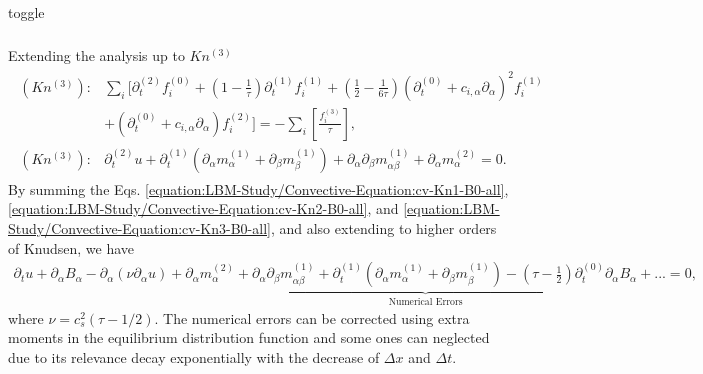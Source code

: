 \documentclass[letterpaper,10pt,english,openany,oneside]{jupyterBook}
\begin{document}
\begin{sphinxuseclass}{toggle}
\begin{equation}
\begin{split}
\begin{array}{l}
\end{array}
\end{split}
\end{equation}
\sphinxAtStartPar
Extending the analysis up to \(Kn^{(3)}\)
\begin{equation}\label{equation:LBM-Study/Convective-Equation:cv-Kn3-B0-all}
\begin{split}
\begin{array}{ll}
(Kn^{(3)}):& \displaystyle\sum_{i}\Bigg[ \partial_{t}^{(2)} f_{i}^{(0)} + \left(1-\displaystyle\frac{1}{\tau}\right)\partial_{t}^{(1)} f_{i}^{(1)} + \left(\frac{1}{2} - \frac{1}{6\tau}\right) \left( \partial_{t}^{(0)} + c_{i,\alpha}\partial_{\alpha} \right)^{2} f_{i}^{(1)} \\
& + \left( \partial_{t}^{(0)} + c_{i,\alpha}\partial_{\alpha} \right)f_{i}^{(2)} \Bigg] =  - \displaystyle\sum_{i}\left[\displaystyle\frac{f_{i}^{(3)}}{\tau} \right], \\
(Kn^{(3)}):& \partial_{t}^{(2)} u + \partial_{t}^{(1)}\left(\partial_{\alpha} m^{(1)}_{\alpha} + \partial_{\beta} m^{(1)}_{\beta}\right) + \partial_{\alpha}\partial_{\beta} m^{(1)}_{\alpha\beta} + \partial_{\alpha} m^{(2)}_{\alpha} = 0.
\end{array}
\end{split}
\end{equation}
\sphinxAtStartPar
By summing the Eqs. \eqref{equation:LBM-Study/Convective-Equation:cv-Kn1-B0-all}, \eqref{equation:LBM-Study/Convective-Equation:cv-Kn2-B0-all}, and \eqref{equation:LBM-Study/Convective-Equation:cv-Kn3-B0-all}, and also extending to higher orders of Knudsen, we have
\begin{equation*}
\begin{split}
\partial_{t}  u + \partial_{\alpha} B_{\alpha} - \partial_{\alpha}\left(\nu \partial_{\alpha} u \right) + \underbrace{\partial_{\alpha} m^{(2)}_{\alpha} + \partial_{\alpha}\partial_{\beta} m^{(1)}_{\alpha\beta} + \partial_{t}^{(1)}\left(\partial_{\alpha} m^{(1)}_{\alpha} + \partial_{\beta} m^{(1)}_{\beta}\right) - \left(\tau - \frac{1}{2} \right) \partial_{t}^{(0)} \partial_{\alpha} B_{\alpha} + ...  }_{\text{Numerical Errors}} =0,
\end{split}
\end{equation*}
\sphinxAtStartPar
where \(\nu=c_{s}^{2}(\tau-1/2)\). The numerical errors can be corrected using extra moments in the equilibrium distribution function and some ones can neglected due to its relevance decay exponentially with the decrease of \(\Delta x\) and \(\Delta t\).

\end{sphinxuseclass}
\end{document}
